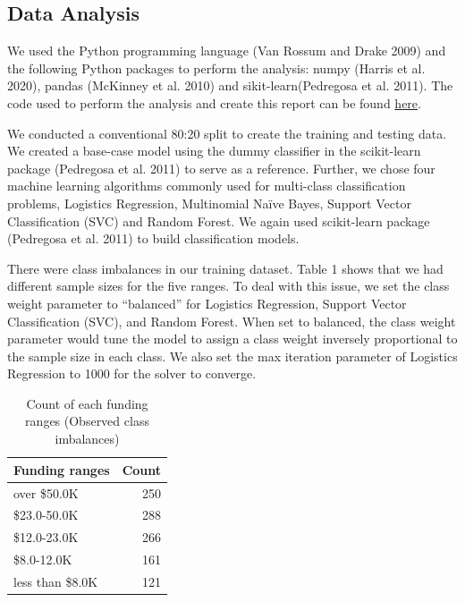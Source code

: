 \documentclass[
]{article}
\begin{document}
\hypertarget{data-analysis}{%
\subsection{Data Analysis}\label{data-analysis}}

We used the Python programming language (Van Rossum and Drake 2009) and
the following Python packages to perform the analysis: numpy (Harris et
al. 2020), pandas (McKinney et al. 2010) and sikit-learn(Pedregosa et
al. 2011). The code used to perform the analysis and create this report
can be found
\href{https://github.com/UBC-MDS/canadian_heritage_funding}{here}.

We conducted a conventional 80:20 split to create the training and
testing data. We created a base-case model using the dummy classifier in
the scikit-learn package (Pedregosa et al. 2011) to serve as a
reference. Further, we chose four machine learning algorithms commonly
used for multi-class classification problems, Logistics Regression,
Multinomial Naïve Bayes, Support Vector Classification (SVC) and Random
Forest. We again used scikit-learn package (Pedregosa et al. 2011) to
build classification models.

There were class imbalances in our training dataset. Table 1 shows that
we had different sample sizes for the five ranges. To deal with this
issue, we set the class weight parameter to ``balanced'' for Logistics
Regression, Support Vector Classification (SVC), and Random Forest. When
set to balanced, the class weight parameter would tune the model to
assign a class weight inversely proportional to the sample size in each
class. We also set the max iteration parameter of Logistics Regression
to 1000 for the solver to converge.

\begin{table}[!h]

\caption{\label{tab:class_imbalance}Count of each funding ranges (Observed class imbalances)}
\centering
\begin{tabular}[t]{l|r}
\hline
Funding ranges & Count\\
\hline
over \$50.0K & 250\\
\hline
\$23.0-50.0K & 288\\
\hline
\$12.0-23.0K & 266\\
\hline
\$8.0-12.0K & 161\\
\hline
less than \$8.0K & 121\\
\hline
\end{tabular}
\end{table}
\end{document}
